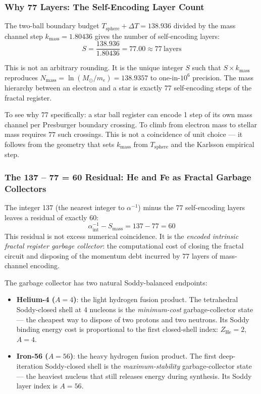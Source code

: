   \subsubsection{Why 77 Layers: The Self-Encoding Layer Count}

    The two-ball boundary budget $T_{\text{sphere}} + \Delta T = 138.936$ divided
    by the mass channel step $k_{\text{mass}} = 1.80436$ gives the number of
    self-encoding layers:
    \[
      S = \frac{138.936}{1.80436} = 77.00 \approx \boxed{77\ \text{layers}}
    \]

    This is not an arbitrary rounding. It is the unique integer $S$ such that
    $S \times k_{\text{mass}}$ reproduces $N_{\text{mass}} = \ln(M_\odot/m_e)
    = 138.9357$ to one-in-$10^6$ precision. The mass hierarchy between an electron
    and a star is exactly 77 self-encoding steps of the fractal register.

    To see why 77 specifically: a star ball register can encode 1 step of its own
    mass channel per Presburger boundary crossing. To climb from electron mass to
    stellar mass requires $77$ such crossings. This is not a coincidence of unit
    choice --- it follows from the geometry that sets $k_{\text{mass}}$ from
    $T_{\text{sphere}}$ and the Karlsson empirical step.

  \subsubsection{The 137 -- 77 = 60 Residual: He and Fe as Fractal Garbage Collectors}

    The integer 137 (the nearest integer to $\alpha^{-1}$) minus the 77 self-encoding
    layers leaves a residual of exactly 60:
    \[
      \alpha^{-1}_{\text{int}} - S_{\text{mass}} = 137 - 77 = \boxed{60}
    \]
    This residual is not excess numerical coincidence. It is the \emph{encoded
    intrinsic fractal register garbage collector}: the computational cost of
    closing the fractal circuit and disposing of the momentum debt incurred by
    77 layers of mass-channel encoding.

    The garbage collector has two natural Soddy-balanced endpoints:
    \begin{itemize}
      \item \textbf{Helium-4 ($A = 4$)}: the light hydrogen fusion product.
        The tetrahedral Soddy-closed shell at 4 nucleons is the
        \emph{minimum-cost} garbage-collector state --- the cheapest way to
        dispose of two protons and two neutrons. Its Soddy binding energy
        cost is proportional to the first closed-shell index: $Z_{\text{He}}
        = 2$, $A = 4$.

      \item \textbf{Iron-56 ($A = 56$)}: the heavy hydrogen fusion product.
        The first deep-iteration Soddy-closed shell is the \emph{maximum-stability}
        garbage-collector state --- the heaviest nucleus that still releases
        energy during synthesis. Its Soddy layer index is $A = 56$.
    \end{itemize}

